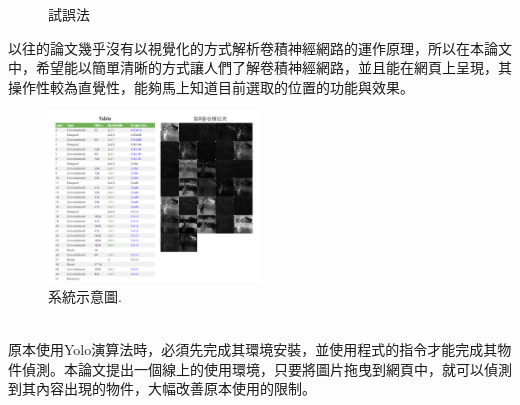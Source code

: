 \begin{figure}[H]
\centering  
{}
\caption{試誤法}
\label{Fig.main}
\end{figure}
以往的論文幾乎沒有以視覺化的方式解析卷積神經網路的運作原理，所以在本論文中，希望能以簡單清晰的方式讓人們了解卷積神經網路，並且能在網頁上呈現，其操作性較為直覺性，能夠馬上知道目前選取的位置的功能與效果。
\begin{figure}[htpb!]
  \centering
    \includegraphics[width=0.5\textwidth]{fig/system1.png}
    \caption{\label{fig:系統1}系統示意圖.}
\end{figure}
\\原本使用Yolo演算法時，必須先完成其環境安裝，並使用程式的指令才能完成其物件偵測。本論文提出一個線上的使用環境，只要將圖片拖曳到網頁中，就可以偵測到其內容出現的物件，大幅改善原本使用的限制。\\

